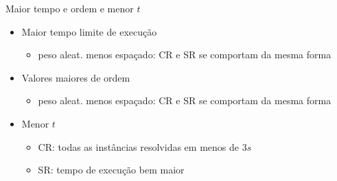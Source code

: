 \documentclass[dvipsnames]{beamer}
\begin{document}
    

\begin{frame}{Maior tempo e ordem e menor $t$}
  \begin{itemize}
  \item <1->Maior tempo limite de execução
    \begin{itemize}
      \item <1->peso aleat. menos espaçado: CR e SR se comportam da mesma forma
    \end{itemize}
  \item <2->Valores maiores de ordem
    \begin{itemize}
      \item <2->peso aleat. menos espaçado: CR e SR se comportam da mesma forma
    \end{itemize}
  \item <3->Menor $t$
    \begin{itemize}
    \item <3->CR: todas as instâncias resolvidas em menos de $3s$
      \item <3->SR: tempo de execução bem maior
      \end{itemize}
    \end{itemize}
  \end{frame}

\end{document}
